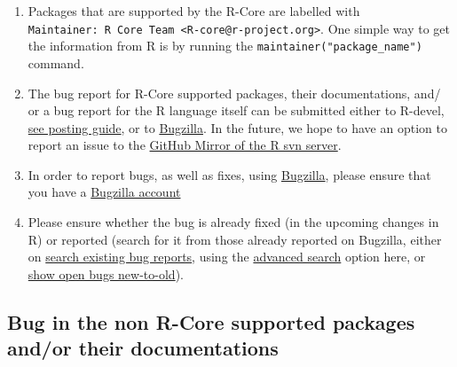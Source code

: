 \documentclass[
]{book}
\begin{document}
\begin{enumerate}
\def\labelenumi{\arabic{enumi}.}
\item
  Packages that are supported by the R-Core are labelled with \texttt{Maintainer:\ R\ Core\ Team\ \textless{}R-core@r-project.org\textgreater{}}. One simple way to get the information from R is by running the \texttt{maintainer("package\_name")} command.
\item
  The bug report for R-Core supported packages, their documentations, and/ or a bug report for the R language itself can be submitted either to R-devel, \href{https://www.r-project.org/posting-guide.html\#which_list}{see posting guide}, or to \href{https://bugs.r-project.org/bugzilla/}{Bugzilla}. In the future, we hope to have an option to report an issue to the \href{https://github.com/r-devel/r-svn/issues}{GitHub Mirror of the R svn server}.
\item
  In order to report bugs, as well as fixes, using \protect\hyperlink{Bugzilla}{Bugzilla}, please ensure that you have a \protect\hyperlink{bugzilla-account}{Bugzilla account}
\item
  Please ensure whether the bug is already fixed (in the upcoming changes in R) or reported (search for it from those already reported on Bugzilla, either on \href{https://bugs.r-project.org/bugzilla/query.cgi}{search existing bug reports}, using the \href{https://bugs.r-project.org/bugzilla/query.cgi?format=advanced}{advanced search} option here, or \href{https://bugs.r-project.org/bugzilla/buglist.cgi?bug_file_loc_type=allwordssubstr\&bug_status=NEW\&bug_status=ASSIGNED\&bug_status=CONFIRMED\&bug_status=REOPENED\&bug_status=UNCONFIRMED\&bugidtype=include\&chfieldto=Now\&cmdtype=doit\&emailassigned_to1=1\&emailassigned_to2=1\&emailcc2=1\&emailreporter2=1\&emailtype1=substring\&emailtype2=substring\&field0-0-0=noop\&long_desc_type=substring\&order=bugs.delta_ts\%20desc\&query_format=advanced\&short_desc_type=allwordssubstr\&type0-0-0=noop}{show open bugs new-to-old}).
\end{enumerate}

\hypertarget{nonRCorePkgBug}{%
\subsection{Bug in the non R-Core supported packages and/or their documentations}\label{nonRCorePkgBug}}
\end{document}
